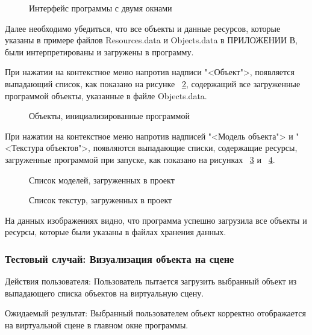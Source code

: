 \begin{figure}[H]
	\caption{Интерфейс программы с двумя окнами}
	\label{screen1:image}
\end{figure}

Далее необходимо убедиться, что все объекты и данные ресурсов, которые указаны в примере файлов Resources.data и Objects.data в ПРИЛОЖЕНИИ В, были интерпретированы и загружены в программу.

При нажатии на контекстное меню напротив надписи "<Объект">, появляется выпадающий список, как показано на рисунке ~\ref{screen2:image}, содержащий все загруженные программой объекты, указанные в файле Objects.data.

\begin{figure}[H]
	\caption{Объекты, инициализированные программой}
	\label{screen2:image}
\end{figure}

При нажатии на контекстное меню напротив надписей "<Модель объекта"> и "<Текстура объектов">, появляются выпадающие списки, содержащие ресурсы, загруженные программой при запуске, как показано на рисунках ~\ref{screen3:image} и ~\ref{screen4:image}.

\begin{figure}[H]
	\caption{Список моделей, загруженных в проект}
	\label{screen3:image}
\end{figure}

\begin{figure}[H]
	\caption{Список текстур, загруженных в проект}
	\label{screen4:image}
\end{figure}

На данных изображениях видно, что программа успешно загрузила все объекты и ресурсы, которые были указаны в файлах хранения данных.

\subsubsection{Тестовый случай: Визуализация объекта на сцене}
Действия пользователя: Пользователь пытается загрузить выбранный объект из выпадающего списка объектов на виртуальную сцену.

Ожидаемый результат: Выбранный пользователем объект корректно отображается на виртуальной сцене в главном окне программы.

